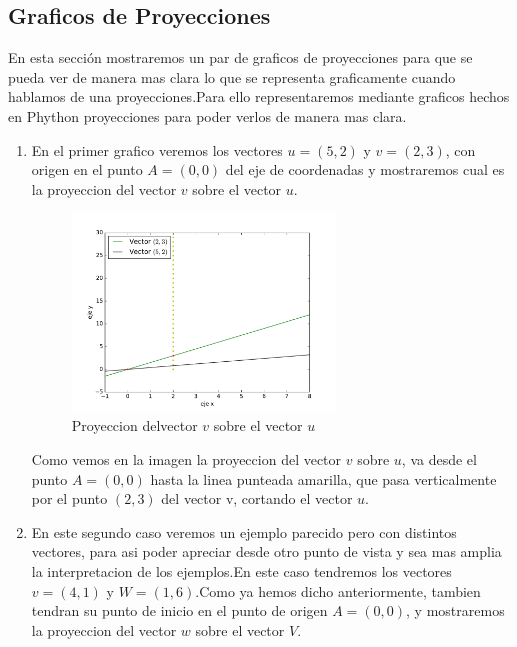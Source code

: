 \documentclass[11pt,spanish,a4paper]{article}
\begin{document}
\subsection{Graficos de Proyecciones}
En esta sección mostraremos un par de graficos de proyecciones para que se pueda ver de manera mas clara lo que se representa graficamente cuando hablamos de una proyecciones.Para ello representaremos mediante graficos hechos en Phython proyecciones para poder verlos de manera mas clara.
\begin{enumerate}

\item En el primer grafico veremos los vectores $u=(5,2)$ y $v= (2,3)$, con origen en el punto $A =(0,0)$ del eje de coordenadas y mostraremos cual es la proyeccion del vector $v$ sobre el vector $u$.

\begin{figure}[h]
\begin{center}
\includegraphics[width=7cm]{graf1.pdf}
\caption{Proyeccion delvector $v$ sobre el vector $u$ }\label{plot1}
\end{center}
\end{figure}

Como vemos en la imagen la proyeccion del vector $v$ sobre $u$, va desde el punto $A=(0,0)$ hasta la linea punteada amarilla, que pasa verticalmente por el punto $(2,3)$ del vector v, cortando el vector $u$. 

\item En este segundo caso veremos un ejemplo parecido pero con distintos vectores, para asi poder apreciar desde otro punto de vista y sea mas amplia la interpretacion de los ejemplos.En este caso tendremos los vectores $v=(4,1)$ y $W=(1,6)$.Como ya hemos dicho anteriormente, tambien tendran su punto de inicio en el punto de origen $A=(0,0)$, y mostraremos la proyeccion del vector $w$ sobre el vector $V$.


\end{enumerate}
\end{document}
